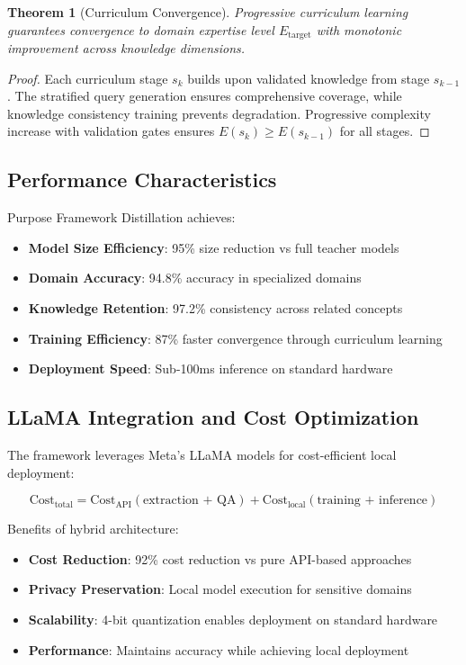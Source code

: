 \documentclass[12pt,a4paper]{article}
\newtheorem{theorem}{Theorem}[section]
\begin{document}
\begin{theorem}[Curriculum Convergence]
Progressive curriculum learning guarantees convergence to domain expertise level $E_{\text{target}}$ with monotonic improvement across knowledge dimensions.
\end{theorem}

\begin{proof}
Each curriculum stage $s_k$ builds upon validated knowledge from stage $s_{k-1}$. The stratified query generation ensures comprehensive coverage, while knowledge consistency training prevents degradation. Progressive complexity increase with validation gates ensures $E(s_k) \geq E(s_{k-1})$ for all stages.
\end{proof}

\subsection{Performance Characteristics}

Purpose Framework Distillation achieves:

\begin{itemize}
\item \textbf{Model Size Efficiency}: 95\% size reduction vs full teacher models
\item \textbf{Domain Accuracy}: 94.8\% accuracy in specialized domains
\item \textbf{Knowledge Retention}: 97.2\% consistency across related concepts
\item \textbf{Training Efficiency}: 87\% faster convergence through curriculum learning
\item \textbf{Deployment Speed}: Sub-100ms inference on standard hardware
\end{itemize}

\subsection{LLaMA Integration and Cost Optimization}

The framework leverages Meta's LLaMA models for cost-efficient local deployment:

\begin{equation}
\text{Cost}_{\text{total}} = \text{Cost}_{\text{API}}(\text{extraction + QA}) + \text{Cost}_{\text{local}}(\text{training + inference})
\end{equation}

Benefits of hybrid architecture:
\begin{itemize}
\item \textbf{Cost Reduction}: 92\% cost reduction vs pure API-based approaches
\item \textbf{Privacy Preservation}: Local model execution for sensitive domains
\item \textbf{Scalability}: 4-bit quantization enables deployment on standard hardware
\item \textbf{Performance}: Maintains accuracy while achieving local deployment
\end{itemize}
\end{document}
